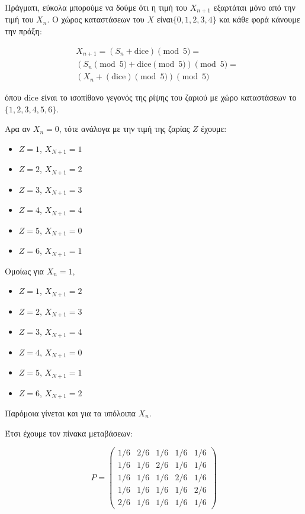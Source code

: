 \documentclass{article}
\newcommand{\english}[1]{\foreignlanguage{english}{{#1}}}
\begin{document}
Πράγματι, εύκολα μπορούμε να δούμε ότι η τιμή του $X_{n+1}$ εξαρτάται μόνο από την τιμή του $X_n$. Ο χώρος καταστάσεων του $X$ είναι$\{0, 1, 2, 3, 4\}$ και κάθε φορά κάνουμε την πράξη: 
\begin{otherlanguage}{english}
    \begin{align*}
        & X_{n+1}  = (S_{n} + \text{dice})\pmod 5 =\\
        & (S_{n}\pmod 5 + \text{dice} \pmod 5) \pmod 5 = \\
        & (X_n + (\text{dice}) \pmod 5) \pmod 5
    \end{align*}
\end{otherlanguage}


όπου \english{dice} είναι το ισοπίθανο γεγονός της ρίψης του ζαριού με χώρο καταστάσεων το $\{1, 2, 3, 4, 5, 6\}$.

Αρα αν $X_n = 0$, τότε ανάλογα με την τιμή της ζαρίας $Z$ έχουμε:
\begin{itemize}
    \item $Z=1$, $X_{N+1} = 1$
    \item $Z=2$, $X_{N+1} = 2$
    \item $Z=3$, $X_{N+1} = 3$
    \item $Z=4$, $X_{N+1} = 4$
    \item $Z=5$, $X_{N+1} = 0$
    \item $Z=6$, $X_{N+1} = 1$
\end{itemize}

Ομοίως για $X_n = 1$,
\begin{itemize}
    \item $Z=1$, $X_{N+1} = 2$
    \item $Z=2$, $X_{N+1} = 3$
    \item $Z=3$, $X_{N+1} = 4$
    \item $Z=4$, $X_{N+1} = 0$
    \item $Z=5$, $X_{N+1} = 1$
    \item $Z=6$, $X_{N+1} = 2$
\end{itemize}

Παρόμοια γίνεται και για τα υπόλοιπα $X_n$.

Έτσι έχουμε τον πίνακα μεταβάσεων:


\begin{equation*}
    P = 
    \begin{pmatrix}
        1/6 & 2/6 & 1/6 & 1/6 & 1/6\\
        1/6 & 1/6 & 2/6 & 1/6 & 1/6 \\
        1/6 & 1/6 & 1/6 & 2/6 & 1/6 \\
        1/6 & 1/6 & 1/6 & 1/6 & 2/6\\
        2/6 & 1/6 & 1/6 & 1/6 & 1/6
    \end{pmatrix}
\end{equation*}
\end{document}
